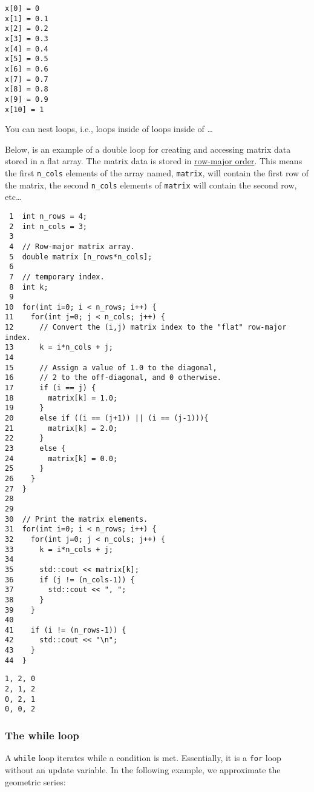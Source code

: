 \documentclass[11pt]{article}
\begin{document}
\begin{verbatim}
x[0] = 0
x[1] = 0.1
x[2] = 0.2
x[3] = 0.3
x[4] = 0.4
x[5] = 0.5
x[6] = 0.6
x[7] = 0.7
x[8] = 0.8
x[9] = 0.9
x[10] = 1
\end{verbatim}

You can nest loops, i.e., loops inside of loops inside of \ldots{}

Below, is an example of a double loop for creating and accessing 
matrix data stored in a flat array. The matrix data is stored in 
\href{https://en.wikipedia.org/wiki/Row-major-order}{row-major order}. This means the first \texttt{n\_cols} elements of the 
array named, \texttt{matrix}, will contain the first row of the matrix, 
the second \texttt{n\_cols} elements of \texttt{matrix} will contain the second row, etc\ldots{}

\begin{verbatim}
 1  int n_rows = 4;
 2  int n_cols = 3;
 3  
 4  // Row-major matrix array.
 5  double matrix [n_rows*n_cols];
 6  
 7  // temporary index.
 8  int k;
 9  
10  for(int i=0; i < n_rows; i++) {
11    for(int j=0; j < n_cols; j++) {
12      // Convert the (i,j) matrix index to the "flat" row-major index.
13      k = i*n_cols + j;
14  
15      // Assign a value of 1.0 to the diagonal,
16      // 2 to the off-diagonal, and 0 otherwise.
17      if (i == j) {
18        matrix[k] = 1.0;
19      }
20      else if ((i == (j+1)) || (i == (j-1))){
21        matrix[k] = 2.0;
22      }
23      else {
24        matrix[k] = 0.0;
25      }
26    }
27  }
28  
29  
30  // Print the matrix elements.
31  for(int i=0; i < n_rows; i++) {
32    for(int j=0; j < n_cols; j++) {
33      k = i*n_cols + j;
34  
35      std::cout << matrix[k];
36      if (j != (n_cols-1)) {
37        std::cout << ", ";
38      }
39    }
40  
41    if (i != (n_rows-1)) {
42      std::cout << "\n";
43    }
44  }
\end{verbatim}

\begin{verbatim}
1, 2, 0
2, 1, 2
0, 2, 1
0, 0, 2
\end{verbatim}

\subsubsection{The while loop}
\label{sec-4-2-2}
A \texttt{while} loop iterates while a condition is met. Essentially, it is a \texttt{for}
loop without an update variable. In the following example, we approximate 
the geometric series:
\end{document}
